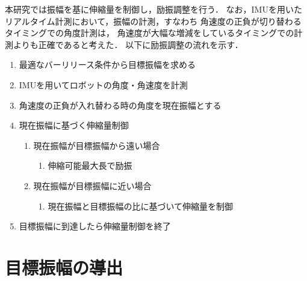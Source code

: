           本研究では振幅を基に伸縮量を制御し，励振調整を行う．
          なお，IMUを用いたリアルタイム計測において，振幅の計測，すなわち
          角速度の正負が切り替わるタイミングでの角度計測は，
          角速度が大幅な増減をしているタイミングでの計測よりも正確であると考えた．
          以下に励振調整の流れを示す．
          \begin{enumerate}
            \item 最適なバーリリース条件から目標振幅を求める
            \item IMUを用いてロボットの角度・角速度を計測
            \item 角速度の正負が入れ替わる時の角度を現在振幅とする
            \item 現在振幅に基づく伸縮量制御
            \begin{enumerate}
              \item 現在振幅が目標振幅から遠い場合
              \begin{enumerate}
              \item 伸縮可能最大長で励振
              \end{enumerate}
              \item 現在振幅が目標振幅に近い場合
              \begin{enumerate}
                \item 現在振幅と目標振幅の比に基づいて伸縮量を制御
              \end{enumerate}
            \end{enumerate}
            \item 目標振幅に到達したら伸縮量制御を終了
          \end{enumerate}

        \section{目標振幅の導出}
          
